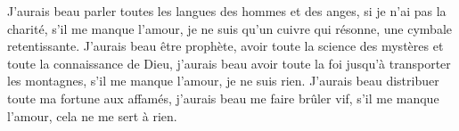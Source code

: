 J’aurais beau parler toutes les langues des hommes et des anges,
	si je n’ai pas la charité, s’il me manque l’amour,
	je ne suis qu’un cuivre qui résonne, une cymbale retentissante.
J’aurais beau être prophète,
	avoir toute la science des mystères et toute la connaissance de Dieu,
	j’aurais beau avoir toute la foi jusqu’à transporter les montagnes,
	s’il me manque l’amour, je ne suis rien.
J’aurais beau distribuer toute ma fortune aux affamés,
	j’aurais beau me faire brûler vif,
	s’il me manque l’amour, cela ne me sert à rien.
